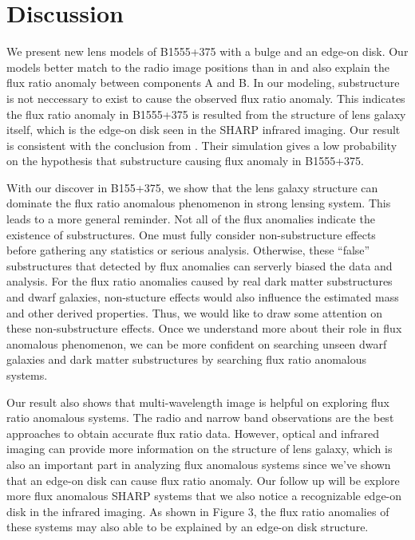 \documentclass[manuscript]{emulateapj}
\begin{document}
\section{Discussion}
We present new lens models of B1555+375 with a bulge and an edge-on disk. Our models better match to the radio image positions than in \citet{Marlow} and also explain the flux ratio anomaly between components A and B. In our modeling, substructure is not neccessary to exist to cause the observed flux ratio anomaly. This indicates the flux ratio anomaly in B1555+375 is resulted from the structure of lens galaxy itself, which is the edge-on disk seen in the SHARP infrared imaging. Our result is consistent with the conclusion from  \citet{Xu14}. Their simulation gives a low probability on the hypothesis that substructure causing flux anomaly in B1555+375.

With our discover in B155+375, we show that the lens galaxy structure can dominate the flux ratio anomalous phenomenon in strong lensing system. This leads to a more general reminder. Not all of the flux anomalies indicate the existence of substructures. One must fully consider non-substructure effects before gathering any statistics or serious analysis. Otherwise, these ``false'' substructures that detected by flux anomalies can serverly biased the data and analysis. For the flux ratio anomalies caused by real dark matter substructures and dwarf galaxies, non-stucture effects would also influence the estimated mass and other derived properties. Thus, we would like to draw some attention on these non-substructure effects. Once we understand more about their role in flux anomalous phenomenon, we can be more confident on searching unseen dwarf galaxies and dark matter substructures by searching flux ratio anomalous systems.

Our result also shows that multi-wavelength image is helpful on exploring flux ratio anomalous systems. The radio and narrow band observations are the best approaches to obtain accurate flux ratio data. However, optical and infrared imaging can provide more information on the structure of lens galaxy, which is also an important part in analyzing flux anomalous systems since we've shown that an edge-on disk can cause flux ratio anomaly. Our follow up will be explore more flux anomalous SHARP systems that we also notice a recognizable edge-on disk in the infrared imaging. As shown in Figure 3, the flux ratio anomalies of these systems may also able to be explained by an edge-on disk structure.\\
 







\end{document}

